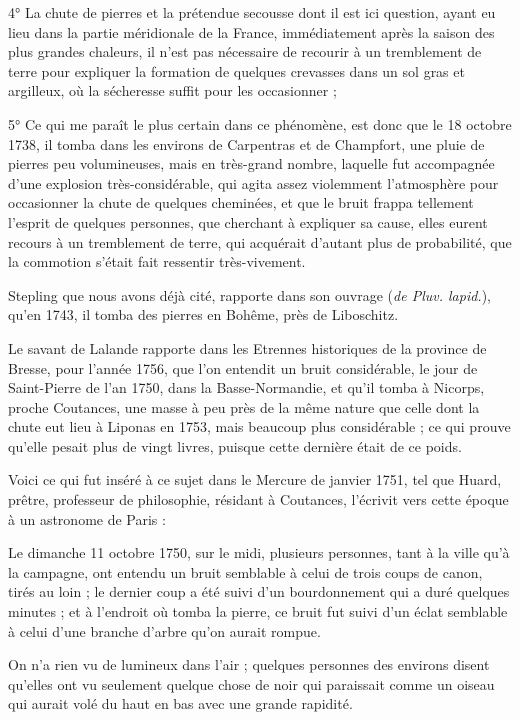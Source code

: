 \documentclass[a4paper, 12pt, oneside, french]{article}
\begin{document}
4° La chute de pierres et la prétendue secousse dont il est ici question, ayant eu lieu dans la partie méridionale de la France, immédiatement après la saison des plus grandes chaleurs, il n'est pas nécessaire de recourir à un tremblement de terre pour expliquer la formation de quelques crevasses dans un sol gras et argilleux, où la sécheresse suffit pour les occasionner ;

5° Ce qui me paraît le plus certain dans ce phénomène, est donc que le 18 octobre 1738, il tomba dans les environs de Carpentras et de Champfort, une pluie de pierres peu volumineuses, mais en très-grand nombre, laquelle fut accompagnée d'une explosion très-considérable, qui agita assez violemment l'atmosphère pour occasionner la chute de quelques cheminées, et que le bruit frappa tellement l'esprit de quelques personnes, que cherchant à expliquer sa cause, elles eurent recours à un tremblement de terre, qui acquérait d'autant plus de probabilité, que la commotion s'était fait ressentir très-vivement.

Stepling que nous avons déjà cité, rapporte dans son ouvrage (\emph{de Pluv. lapid.}), qu'en 1743, il tomba des pierres en Bohême, près de Liboschitz.

Le savant de Lalande rapporte dans les Etrennes historiques de la province de Bresse, pour l'année 1756, que l'on entendit un bruit considérable, le jour de Saint-Pierre de l'an 1750, dans la Basse-Normandie, et qu'il tomba à Nicorps, proche Coutances, une masse à peu près de la même nature que celle dont la chute eut lieu à Liponas en 1753, mais beaucoup plus considérable ; ce qui prouve qu'elle pesait plus de vingt livres, puisque cette dernière était de ce poids.

Voici ce qui fut inséré à ce sujet dans le Mercure de janvier 1751, tel que Huard, prêtre, professeur de philosophie, résidant à Coutances, l'écrivit vers cette époque à un astronome de Paris :

\og Le dimanche 11 octobre 1750, sur le midi, plusieurs personnes, tant à la ville qu'à la campagne, ont entendu un bruit semblable à celui de trois coups de canon, tirés au loin ; le dernier coup a été suivi d'un bourdonnement qui a duré quelques minutes ; et à l'endroit où tomba la pierre, ce bruit fut suivi d'un éclat semblable à celui d'une branche d'arbre qu'on aurait rompue. \fg

\og On n'a rien vu de lumineux dans l'air ; quelques personnes des environs disent qu'elles ont vu seulement quelque chose de noir qui paraissait comme un oiseau qui aurait volé du haut en bas avec une grande rapidité. \fg
\end{document}
